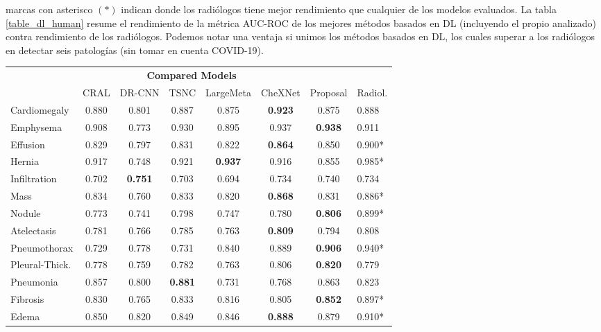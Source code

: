 marcas con asterisco $(*)$ indican donde los radiólogos tiene mejor rendimiento que cualquier de los
modelos evaluados. La tabla \ref{table_dl_human} resume el rendimiento de la métrica AUC-ROC de los mejores métodos
basados en DL (incluyendo el propio analizado) contra rendimiento de los radiólogos. Podemos notar
una ventaja si unimos los métodos basados en DL, los cuales superar a los radiólogos en detectar
seis patologías (sin tomar en cuenta COVID-19).

\begin{table}[tb]
    \centering
    \begin{tabular}{|l||c|c|c|c|c|c|l|}
        \hline
        \multicolumn{1}{|c||}{}	&	\multicolumn{5}{c|}{\bf Compared Models}    &\multicolumn{2}{c|}{} 	\\
        \cline{2-8}
                        &	CRAL	&	DR-CNN	&	TSNC	& LargeMeta & CheXNet	& Proposal	& 	Radiol.	\\
        \hline\hline
        Cardiomegaly	&	0.880	&	0.801	&	0.887	&	0.875	&\bf{0.923}	&	0.875	&	0.888	\\
        Emphysema	    &	0.908	&	0.773	&	0.930	&	0.895	&	0.937	&\bf{0.938}	&   0.911	\\
        Effusion	    &	0.829	&	0.797	&	0.831	&	0.822	&\bf{0.864}	&	0.850	&   0.900*	\\
        Hernia	        &	0.917	&	0.748	&	0.921	&\bf{0.937}	&	0.916	&	0.855	&   0.985*	\\
        Infiltration	&	0.702	&\bf{0.751}	&	0.703	&	0.694	&	0.734	&	0.740	&	0.734	\\
        Mass	        &	0.834	&	0.760	&	0.833	&	0.820	&\bf{0.868}	&	0.831	&	0.886*	\\
        Nodule	        &	0.773	&	0.741	&	0.798	&	0.747	&	0.780	&\bf{0.806}	&	0.899*	\\
        Atelectasis	    &	0.781	&	0.766	&	0.785	&	0.763	&\bf{0.809}	&	0.794	&	0.808	\\
        Pneumothorax	&	0.729	&	0.778	&	0.731	&	0.840	&	0.889	&\bf{0.906}	&	0.940*	\\
        Pleural-Thick.	&	0.778	&	0.759	&	0.782	&	0.763	&	0.806	&\bf{0.820}	&	0.779	\\
        Pneumonia	    &	0.857	&	0.800	&\bf{0.881}	&	0.731	&	0.768	&	0.863	&	0.823	\\
        Fibrosis	    &	0.830	&	0.765	&	0.833	&	0.816	&	0.805	&\bf{0.852}	&	0.897*	\\
        Edema	        &	0.850	&	0.820	&	0.849	&	0.846	&\bf{0.888}	&	0.879	&	0.910*	\\

\end{tabular}
\end{table}
